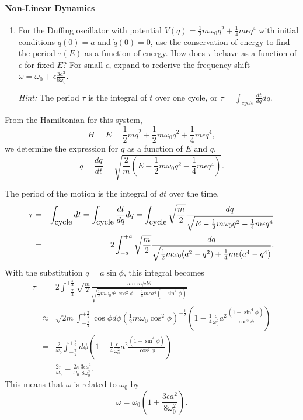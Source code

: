 \documentclass[letterpaper,11pt]{article}
\begin{document}
\paragraph*{Non-Linear Dynamics}
\begin{enumerate}[resume]
 \item For the Duffing oscillator with potential $V(q) = \frac{1}{2} m \omega_0 q^2 + \frac{1}{4} m \epsilon q^4$ with initial conditions $q(0) = a$ and $\dot{q}(0) = 0$, use the conservation of energy to find the period $\tau(E)$ as a function of energy.  How does $\tau$ behave as a function of $\epsilon$ for fixed $E$?  For small $\epsilon$, expand to rederive the frequency shift $\omega = \omega_0 + \epsilon \frac{3a^2}{8\omega_0}$.
 
 \textit{Hint:} The period $\tau$ is the integral of $t$ over one cycle, or $\tau = \int_{cycle} \frac{dt}{dq} dq$.
\end{enumerate}

From the Hamiltonian for this system,
\begin{equation*}
 H = E = \frac{1}{2} m\dot{q}^2 + \frac{1}{2} m \omega_0 q^2 + \frac{1}{4} m \epsilon q^4,
\end{equation*}
we determine the expression for $\dot{q}$ as a function of $E$ and $q$,
\begin{equation*}
 \dot{q} = \frac{dq}{dt} = \sqrt{\frac{2}{m} \left( E - \frac{1}{2} m \omega_0 q^2 - \frac{1}{4} m \epsilon q^4 \right)}.
\end{equation*}

The period of the motion is the integral of $dt$ over the time,
\begin{eqnarray*}
 \tau & = & \int_{\hbox{cycle}} dt = \int_{\hbox{cycle}} \frac{dt}{dq} dq = \int_{\hbox{cycle}} \sqrt{\frac{m}{2}} \frac{dq}{\sqrt{E - \frac{1}{2} m \omega_0 q^2 - \frac{1}{4} m \epsilon q^4}} \\
 & = & 2 \int_{-a}^{+a} \sqrt{\frac{m}{2}} \frac{dq}{\sqrt{\frac{1}{2} m \omega_0 (a^2 - q^2) + \frac{1}{4} m \epsilon (a^4 - q^4)}}.
\end{eqnarray*}
With the substitution $q = a \sin\phi$, this integral becomes
\begin{eqnarray*}
 \tau & = & 2 \int_{-\frac{\pi}{2}}^{+\frac{\pi}{2}} \sqrt{\frac{m}{2}} \frac{a \cos\phi d\phi}{\sqrt{\frac{1}{2} m \omega_0 a^2 \cos^2\phi + \frac{1}{4} m \epsilon a^4 ( - \sin^4\phi)}} \\
 & \approx & \sqrt{2 m} \int_{-\frac{\pi}{2}}^{+\frac{\pi}{2}} \cos\phi d\phi \left( \frac{1}{2} m \omega_0 \cos^2\phi \right)^{-\frac{1}{2}} \left( 1 - \frac{1}{4} \frac{\epsilon}{\omega_0^2} a^2 \frac{(1 - \sin^4\phi)}{\cos^2\phi} \right) \\
 & = & \frac{2}{\omega_0} \int_{-\frac{\pi}{2}}^{+\frac{\pi}{2}} d\phi \left( 1 - \frac{1}{4} \frac{\epsilon}{\omega_0^2} a^2 \frac{(1 - \sin^4\phi)}{\cos^2\phi} \right) \\
 & = & \frac{2\pi}{\omega_0} - \frac{2\pi}{\omega_0} \frac{3 \epsilon a^2}{8 \omega_0^2}.
\end{eqnarray*}
This means that $\omega$ is related to $\omega_0$ by
\begin{equation*}
 \omega = \omega_0 (1 + \frac{3 \epsilon a^2}{8 \omega_0^2}).
\end{equation*}
\end{document}
